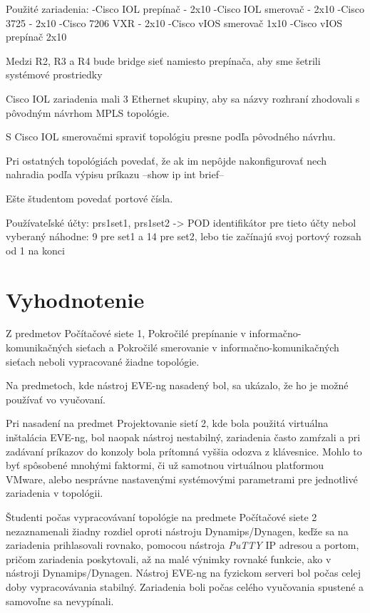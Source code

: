 Použité zariadenia:
-Cisco IOL prepínač - 2x10
-Cisco IOL smerovač - 2x10
-Cisco 3725 - 2x10
-Cisco 7206 VXR - 2x10
-Cisco vIOS smerovač 1x10
-Cisco vIOS prepínač 2x10

Medzi R2, R3 a R4 bude bridge sieť namiesto prepínača, aby sme šetrili systémové prostriedky

Cisco IOL zariadenia mali 3 Ethernet skupiny, aby sa názvy rozhraní zhodovali s pôvodným návrhom MPLS topológie.

S Cisco IOL smerovačmi spraviť topológiu presne podľa pôvodného návrhu.

Pri ostatných topológiách povedať, že ak im nepôjde nakonfigurovať nech nahradia podľa výpisu príkazu --show ip int brief--

Ešte študentom povedať portové čísla. 

Používateľské účty: prs1set1, prs1set2 -> POD identifikátor pre tieto účty nebol vyberaný náhodne: 9 pre set1 a 14 pre set2, lebo tie začínajú svoj portový rozsah od 1 na konci





\section{Vyhodnotenie}

Z predmetov Počítačové siete 1, Pokročilé prepínanie v informačno-komunikačných sieťach a Pokročilé smerovanie v informačno-komunikačných sieťach neboli vypracované žiadne topológie.

Na predmetoch, kde nástroj EVE-ng nasadený bol, sa ukázalo, že ho je možné používať vo vyučovaní.

Pri nasadení na predmet Projektovanie sietí 2, kde bola použitá virtuálna inštalácia EVE-ng, bol naopak nástroj nestabilný, zariadenia často zamŕzali a pri zadávaní príkazov do konzoly bola prítomná vyššia odozva z klávesnice. Mohlo to byť spôsobené mnohými faktormi, či už samotnou virtuálnou platformou VMware, alebo nesprávne nastavenými systémovými parametrami pre jednotlivé zariadenia v topológii.

Študenti počas vypracovávaní topológie na predmete Počítačové siete 2 nezaznamenali žiadny rozdiel oproti nástroju Dynamips/Dynagen, keďže sa na zariadenia prihlasovali rovnako, pomocou nástroja \emph{PuTTY} IP adresou a portom, pričom zariadenia poskytovali, až na malé výnimky rovnaké funkcie, ako v nástroji Dynamips/Dynagen. Nástroj EVE-ng na fyzickom serveri bol počas celej doby vypracovávania stabilný. Zariadenia boli počas celého vyučovania spustené a samovoľne sa nevypínali.

